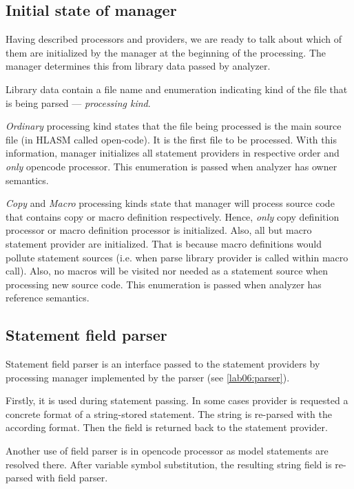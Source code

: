 \subsection{Initial state of manager}
\label{lab06:lib_data}
Having described processors and providers, we are ready to talk about which of them are initialized by the manager at the beginning of the processing. The manager determines this from library data passed by analyzer.

Library data contain a file name and enumeration indicating kind of the file that is being parsed --- \emph{processing kind}.

\emph{Ordinary} processing kind states that the file being processed is the main source file (in HLASM called open-code). It is the first file to be processed. With this information, manager initializes all statement providers in respective order and \emph{only} opencode processor. This enumeration is passed when analyzer has owner semantics.

\emph{Copy} and \emph{Macro} processing kinds state that manager will process source code that contains copy or macro definition respectively. Hence, \emph{only} copy definition processor or macro definition processor is initialized. Also, all but macro statement provider are initialized. That is because macro definitions would pollute statement sources (i.e. when parse library provider is called within macro call). Also, no macros will be visited nor needed as a statement source when processing new source code. This enumeration is passed when analyzer has reference semantics.


\subsection{Statement field parser}
\label{lab06:field_parser}

Statement field parser is an interface passed to the statement providers by processing manager implemented by the parser (see \cref{lab06:parser}).

Firstly, it is used during statement passing. In some cases provider is requested a concrete format of a string-stored statement. The string is re-parsed with the according format. Then the field is returned back to the statement provider. 

Another use of field parser is in opencode processor as model statements are resolved there. After variable symbol substitution, the resulting string field is re-parsed with field parser.

